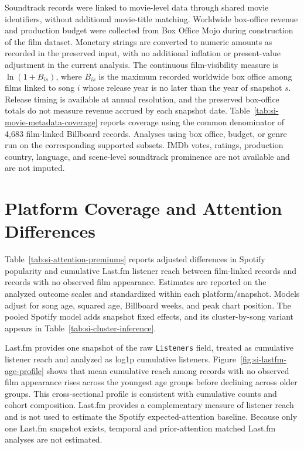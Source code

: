 \documentclass[11pt]{article}
\begin{document}
Soundtrack records were linked to movie-level data through shared movie identifiers, without additional movie-title matching. Worldwide box-office revenue and production budget were collected from Box Office Mojo during construction of the film dataset. Monetary strings are converted to numeric amounts as recorded in the preserved input, with no additional inflation or present-value adjustment in the current analysis. The continuous film-visibility measure is $\ln(1+B_{is})$, where $B_{is}$ is the maximum recorded worldwide box office among films linked to song $i$ whose release year is no later than the year of snapshot $s$. Release timing is available at annual resolution, and the preserved box-office totals do not measure revenue accrued by each snapshot date. Table~\ref{tab:si-movie-metadata-coverage} reports coverage using the common denominator of 4,683 film-linked Billboard records. Analyses using box office, budget, or genre run on the corresponding supported subsets. IMDb votes, ratings, production country, language, and scene-level soundtrack prominence are not available and are not imputed.



\section*{Platform Coverage and Attention Differences}

Table~\ref{tab:si-attention-premiums} reports adjusted differences in Spotify popularity and cumulative Last.fm listener reach between film-linked records and records with no observed film appearance. Estimates are reported on the analyzed outcome scales and standardized within each platform/snapshot. Models adjust for song age, squared age, Billboard weeks, and peak chart position. The pooled Spotify model adds snapshot fixed effects, and its cluster-by-song variant appears in Table~\ref{tab:si-cluster-inference}.



Last.fm provides one snapshot of the raw \texttt{Listeners} field, treated as cumulative listener reach and analyzed as log1p cumulative listeners. Figure~\ref{fig:si-lastfm-age-profile} shows that mean cumulative reach among records with no observed film appearance rises across the youngest age groups before declining across older groups. This cross-sectional profile is consistent with cumulative counts and cohort composition. Last.fm provides a complementary measure of listener reach and is not used to estimate the Spotify expected-attention baseline. Because only one Last.fm snapshot exists, temporal and prior-attention matched Last.fm analyses are not estimated.
\end{document}

